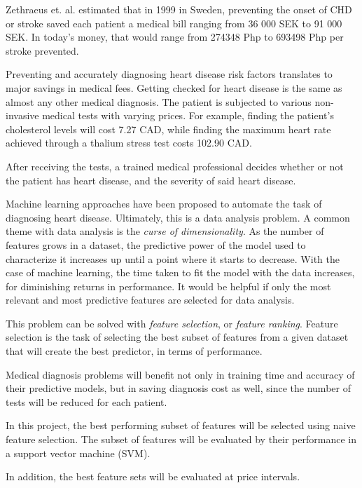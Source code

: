 \documentclass[conference]{IEEEtran}
\begin{document}
	Zethraeus et. al.\cite{bib:stroke_save} estimated that in 1999 in Sweden, preventing the onset of CHD or stroke saved each patient a medical bill ranging from 36 000 SEK to 91 000 SEK.
	In today's money, that would range from 274348 Php to 693498 Php per stroke prevented. \cite{bib:secpi}

	Preventing and accurately diagnosing heart disease risk factors translates to major savings in medical fees.
	Getting checked for heart disease is the same as almost any other medical diagnosis.
	The patient is subjected to various non-invasive medical tests with varying prices.
	For example, finding the patient's cholesterol levels will cost 7.27 CAD, while finding the maximum heart rate achieved through a thalium stress test costs 102.90 CAD. \cite{bib:dataset}

	After receiving the tests, a trained medical professional decides whether or not the patient has heart disease, and the severity of said heart disease.

	Machine learning approaches have been proposed to automate the task of diagnosing heart disease.\cite{bib:dataset} \cite{bib:mltech}
	Ultimately, this is a data analysis problem.
	A common theme with data analysis is the \emph{curse of dimensionality}.
	As the number of features grows in a dataset, the predictive power of the model used to characterize it increases up until a point where it starts to decrease. \cite{bib:curse}
	With the case of machine learning, the time taken to fit the model with the data increases, for diminishing returns in performance.
	It would be helpful if only the most relevant and most predictive features are selected for data analysis.

	This problem can be solved with \emph{feature selection}, or \emph{feature ranking}.
	Feature selection is the task of selecting the best subset of features from a given dataset that will create the best predictor, in terms of performance.

	Medical diagnosis problems will benefit not only in training time and accuracy of their predictive models, but in saving diagnosis cost as well, since the number of tests will be reduced for each patient.

	In this project, the best performing subset of features will be selected using naive feature selection.
	The subset of features will be evaluated by their performance in a support vector machine (SVM).
	
	In addition, the best feature sets will be evaluated at price intervals.
\end{document}
